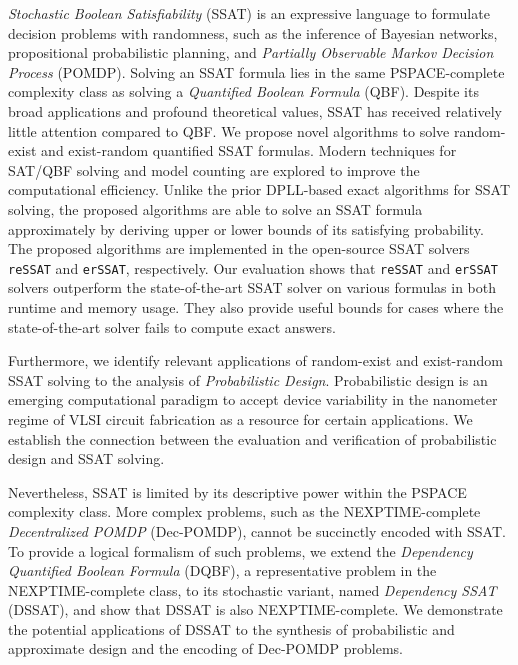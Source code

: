\textit{Stochastic Boolean Satisfiability} (SSAT) is an expressive language to formulate decision problems with randomness, such as the inference of Bayesian networks, propositional probabilistic planning, and \textit{Partially Observable Markov Decision Process} (POMDP).
Solving an SSAT formula lies in the same PSPACE-complete complexity class as solving a \textit{Quantified Boolean Formula} (QBF).
Despite its broad applications and profound theoretical values, SSAT has received relatively little attention compared to QBF.
We propose novel algorithms to solve random-exist and exist-random quantified SSAT formulas.
Modern techniques for SAT/QBF solving and model counting are explored to improve the computational efficiency.
Unlike the prior DPLL-based exact algorithms for SSAT solving, the proposed algorithms are able to solve an SSAT formula approximately by deriving upper or lower bounds of its satisfying probability.
The proposed algorithms are implemented in the open-source SSAT solvers \texttt{reSSAT} and \texttt{erSSAT}, respectively.
Our evaluation shows that \texttt{reSSAT} and \texttt{erSSAT} solvers outperform the state-of-the-art SSAT solver on various formulas in both runtime and memory usage.
They also provide useful bounds for cases where the state-of-the-art solver fails to compute exact answers.

Furthermore, we identify relevant applications of random-exist and exist-random SSAT solving to the analysis of \textit{Probabilistic Design}.
Probabilistic design is an emerging computational paradigm to accept device variability in the nanometer regime of VLSI circuit fabrication as a resource for certain applications.
We establish the connection between the evaluation and verification of probabilistic design and SSAT solving.

Nevertheless, SSAT is limited by its descriptive power within the PSPACE complexity class.
More complex problems, such as the NEXPTIME-complete \textit{Decentralized POMDP} (Dec-POMDP), cannot be succinctly encoded with SSAT.
To provide a logical formalism of such problems, we extend the \textit{Dependency Quantified Boolean Formula} (DQBF),
a representative problem in the NEXPTIME-complete class, to its stochastic variant,
named \textit{Dependency SSAT} (DSSAT), and show that DSSAT is also NEXPTIME-complete.
We demonstrate the potential applications of DSSAT to the synthesis of probabilistic and approximate design and the encoding of Dec-POMDP problems.

